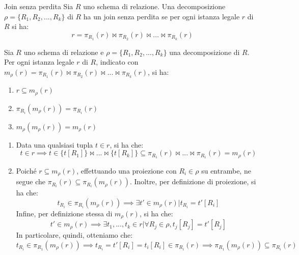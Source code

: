 \begin{Definition}{Join senza perdita}{}
    Sia $R$ uno schema di relazione. Una decomposizione $\rho=\{R_1, R_2,..., R_k\}$ di $R$ ha un join senza perdita se per ogni istanza legale $r$ di $R$ si ha:
    \begin{equation*}
        r=\pi_{R_1}(r)\bowtie\pi_{R_2}(r)\bowtie ...\bowtie\pi_{R_k}(r)
    \end{equation*}
\end{Definition}

\begin{Thm}{}{}
    Sia $R$ uno schema di relazione e $\rho=\{R_1, R_2,..., R_k\}$ una decomposizione di $R$. Per ogni istanza legale $r$ di $R$, indicato con $m_\rho(r)=\pi_{R_1}(r)\bowtie\pi_{R_2}(r)\bowtie ...\bowtie\pi_{R_k}(r)$, si ha:
    \begin{enumerate}[label=(\alph*)]
        \item $r\subseteq m_\rho (r)$
        \item $\pi_{R_i}(m_\rho(r))=\pi_{R_i}(r)$
        \item $m_\rho (m_\rho(r))=m_\rho (r)$
    \end{enumerate}
    \begin{demonstration}\phantom{}
    \begin{enumerate}[label=(\alph*)]
        \item Data una qualsiasi tupla $t\in r$, si ha che:
        \begin{equation*}
            t\in r\implies t\in \{t[R_1]\}\bowtie ...\bowtie\{t[R_k]\}\subseteq\pi_{R_1}(r)\bowtie ...\bowtie\pi_{R_1}(r)=m_\rho (r)
        \end{equation*}

        \item Poiché $r\subseteq m_\rho (r)$, effettuando una proiezione con $R_i\in\rho$ su entrambe, ne segue che $\pi_{R_i}(r)\subseteq\pi_{R_i}(m_\rho (r))$. Inoltre, per definizione di proiezione, si ha che:
        \begin{equation*}
            t_{R_i} \in \pi_{R_i}(m_\rho (r)) \implies \exists t' \in m_\rho (r) | t_{R_i} = t'[R_i]
        \end{equation*}
        Infine, per definizione stessa di $m_\rho (r)$, si ha che:
        \begin{equation*}
            t' \in m_\rho (r) \implies \exists t_1, . . . , t_k \in r | \forall R_j \in \rho, t_j[R_j] = t'[R_j]
        \end{equation*}
        In particolare, quindi, otteniamo che:
        \begin{equation*}
            t_{R_i} \in \pi_{R_1}(m_\rho (r)) \implies t_{R_i} = t'[R_i] = t_i[R_i] \in \pi_{R_i}(r) \implies \pi_{R_1}(m_\rho (r)) \subseteq \pi_{R_i}(r)
        \end{equation*}


\end{enumerate}
\end{demonstration}
\end{Thm}
